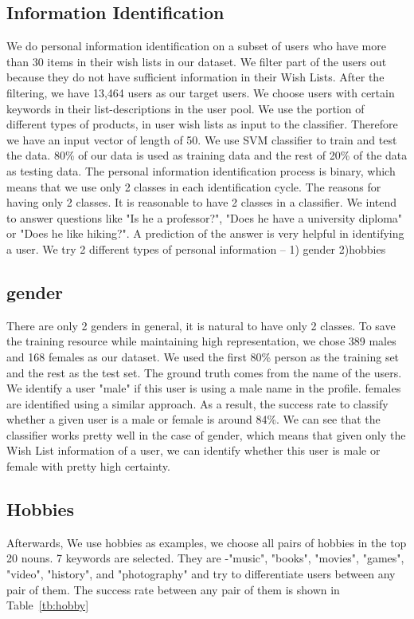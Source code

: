\subsection{Information Identification}
We do personal information identification on a subset of users who have more than 30 items in their wish lists in our dataset. We filter part of the users out because they do not have sufficient information in their Wish Lists. After the filtering, we have 13,464 users as our target users. We choose users with certain keywords in their list-descriptions in the user pool. We use the portion of different types of products,  in user wish lists as input to the classifier. Therefore we have an input vector of length of 50. We use SVM classifier to train and test the data. 80\% of our data is used as training data and the rest of 20\% of the data as testing data. The personal information identification process is binary, which means that we use only 2 classes in each identification cycle. The reasons for having only 2 classes. It is reasonable to have 2 classes in a classifier. We intend to answer questions like "Is he a professor?", "Does he have a university diploma" or "Does he like hiking?". A prediction of the answer is very helpful in identifying a user. We try 2 different types of personal information -- 1) gender 2)hobbies

\subsection{gender}
There are only 2 genders in general, it is natural to have only 2 classes. To save the training resource while maintaining high representation, we chose 389 males and 168 females as our dataset. We used the first 80\% person as the training set and the rest as the test set. The ground truth comes from the name of the users. We identify a user "male" if this user is using a male name in the profile. females are identified using a similar approach. As a result, the success rate to classify whether a given user is a male or female is around 84\%.
We can see that the classifier works pretty well in the case of gender, which means that given only the Wish List information of a user, we can identify whether this user is male or female with pretty high certainty.

\subsection{Hobbies}
Afterwards, We use hobbies as examples, we choose all pairs of hobbies in the top 20 nouns. 7 keywords are selected. They are -"music", "books", "movies", "games", "video", "history", and "photography" and try to differentiate users between any pair of them. The success rate between any pair of them is shown in Table~\ref{tb:hobby}

